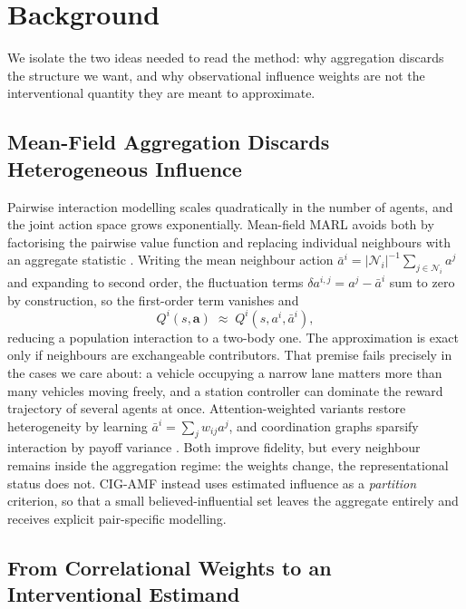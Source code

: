 \documentclass[conference]{IEEEtran}
\begin{document}
\section{Background}

We isolate the two ideas needed to read the method: why aggregation discards the structure we want, and why observational influence weights are not the interventional quantity they are meant to approximate.

\subsection{Mean-Field Aggregation Discards Heterogeneous Influence}

Pairwise interaction modelling scales quadratically in the number of agents, and the joint action space grows exponentially. Mean-field MARL avoids both by factorising the pairwise value function and replacing individual neighbours with an aggregate statistic \cite{yang2018mfmarl}. Writing the mean neighbour action $\bar{a}^{i}=|\mathcal{N}_i|^{-1}\sum_{j\in\mathcal{N}_i}a^{j}$ and expanding to second order, the fluctuation terms $\delta a^{i,j}=a^{j}-\bar{a}^{i}$ sum to zero by construction, so the first-order term vanishes and
\begin{equation}
Q^{i}(s,\mathbf{a})\;\approx\;Q^{i}(s,a^{i},\bar{a}^{i}),
\label{eq:mf}
\end{equation}
reducing a population interaction to a two-body one. The approximation is exact only if neighbours are exchangeable contributors. That premise fails precisely in the cases we care about: a vehicle occupying a narrow lane matters more than many vehicles moving freely, and a station controller can dominate the reward trajectory of several agents at once. Attention-weighted variants \cite{hao2023gatmf, wang2024amf} restore heterogeneity by learning $\bar{a}^{i}=\sum_j w_{ij}a^{j}$, and coordination graphs sparsify interaction by payoff variance \cite{boehmer2020dcg, wang2022casec}. Both improve fidelity, but every neighbour remains inside the aggregation regime: the weights change, the representational status does not. CIG-AMF instead uses estimated influence as a \emph{partition} criterion, so that a small believed-influential set leaves the aggregate entirely and receives explicit pair-specific modelling.

\subsection{From Correlational Weights to an Interventional Estimand}
\end{document}
